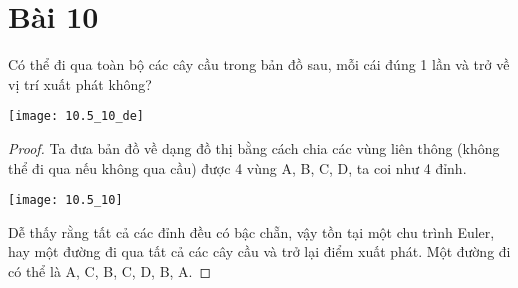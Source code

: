\section*{Bài 10}
Có thể đi qua toàn bộ các cây cầu trong bản đồ sau, mỗi cái đúng 1 lần và trở về vị trí xuất phát không?
\begin{center}
	\texttt{[image: 10.5\_10\_de]}
\end{center}
\begin{proof}
Ta đưa bản đồ về dạng đồ thị bằng cách chia các vùng liên thông (không thể đi qua nếu không qua cầu) được 4 vùng A, B, C, D, ta coi như 4 đỉnh.
\begin{center}
	\texttt{[image: 10.5\_10]}
\end{center}
Dễ thấy rằng tất cả các đỉnh đều có bậc chẵn, vậy tồn tại một chu trình Euler, hay một đường đi qua tất cả các cây cầu và trở lại điểm xuất phát. Một đường đi có thể là A, C, B, C, D, B, A.
\end{proof}